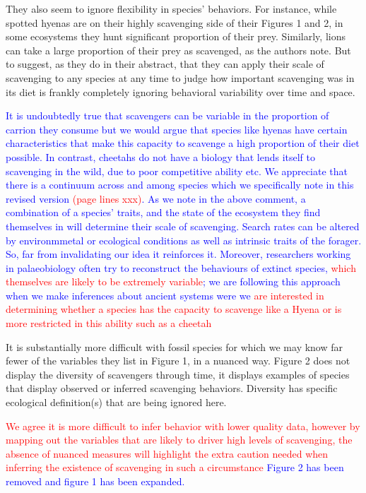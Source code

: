 \documentclass[12pt,letterpaper]{article}
\begin{document}
They also seem to ignore flexibility in species' behaviors.
For instance, while spotted hyenas are on their highly scavenging side of their Figures 1 and 2, in some ecosystems they hunt significant proportion of their prey.
Similarly, lions can take a large proportion of their prey as scavenged, as the authors note.
But to suggest, as they do in their abstract, that they can apply their scale of scavenging to any species at any time to judge how important scavenging was in its diet is frankly completely ignoring behavioral variability over time and space. 
\bigskip

\textcolor{blue}{It is undoubtedly true that scavengers can be variable in the proportion of carrion they consume but we would argue that species like hyenas have certain characteristics that make this capacity to scavenge  a high proportion of their diet possible.
In contrast, cheetahs do not have a biology that lends itself to scavenging in the wild, due to poor competitive ability etc.
We appreciate that there is a continuum across and among species which we specifically note in this revised version \textcolor{red}{(page lines xxx)}. 
As we note in the above comment, a combination of a species' traits, and the state of the ecosystem they find themselves in will determine their scale of scavenging. 
Search rates can be altered by environmmetal or ecological conditions as well as intrinsic traits of the forager. 
So, far from invalidating our idea it reinforces it.
Moreover, researchers working in palaeobiology often try to reconstruct the behaviours of extinct species, \textcolor{red}{which themselves are likely to be extremely variable}; we are following this approach when we make inferences about ancient systems were we \textcolor{red}{are interested in determining whether a species has the capacity to scavenge like a Hyena or is more restricted in this ability such as a cheetah}}
\bigskip

It is substantially more difficult with fossil species for which we may know far fewer of the variables they list in Figure 1, in a nuanced way.
Figure 2 does not display the diversity of scavengers through time, it displays examples of species that display observed or inferred scavenging behaviors.
Diversity has specific ecological definition(s) that are being ignored here.
\bigskip

\textcolor{red}{We agree it is more difficult to infer behavior with lower quality data, however by mapping out the variables that are likely to driver high levels of scavenging, the absence of nuanced measures will highlight the extra caution needed when inferring the existence of scavenging in such a circumstance}
\textcolor{blue}{Figure 2 has been removed and figure 1 has been expanded.}
\end{document}
